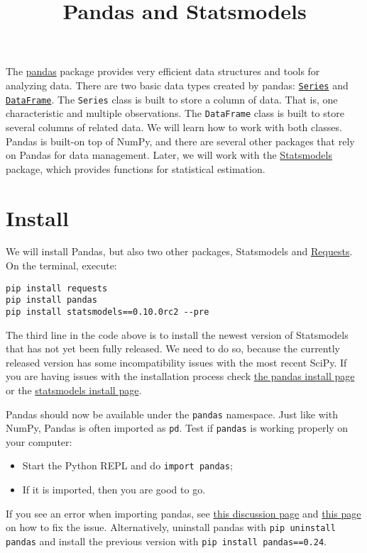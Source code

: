 \documentclass[12pt, a4paper]{article}
\date{}
\title{Pandas and Statsmodels}
\begin{document}
\maketitle
The \href{https://pandas.pydata.org}{pandas} package provides very efficient data structures and tools for analyzing data.
There are two basic data types created by pandas: \href{https://pandas.pydata.org/pandas-docs/stable/reference/series.html}{\texttt{Series}} and \href{https://pandas.pydata.org/pandas-docs/stable/reference/frame.html}{\texttt{DataFrame}}.
The \texttt{Series} class is built to store a column of data.
That is, one characteristic and multiple observations.
The \texttt{DataFrame} class is built to store several columns of related data.
We will learn how to work with both classes.
Pandas is built-on top of NumPy, and there are several other packages that rely on Pandas for data management.
Later, we will work with the \href{https://www.statsmodels.org/stable/index.html}{Statsmodels} package, which provides functions for statistical estimation.
\section{Install}
\label{sec:org51a9f00}
We will install Pandas, but also two other packages, Statsmodels and \href{https://2.python-requests.org/en/master/}{Requests}.
On the terminal, execute:
\lstset{language=bash,label= ,caption= ,captionpos=b,firstnumber=1,numbers=left,style=bash}
\begin{lstlisting}
pip install requests
pip install pandas
pip install statsmodels==0.10.0rc2 --pre
\end{lstlisting}
The third line in the code above is to install the newest version of Statsmodels that has not yet been fully released.
We need to do so, because the currently released version has some incompatibility issues with the most recent SciPy.
If you are having issues with the installation process check \href{https://pandas.pydata.org/pandas-docs/stable/install.html}{the pandas install page} or the \href{https://www.statsmodels.org/stable/install.html}{statsmodels install page}.

Pandas should now be available under the \texttt{pandas} namespace.
Just like with NumPy, Pandas is often imported as \texttt{pd}.
Test if \texttt{pandas} is working properly on your computer:
\begin{itemize}
\item Start the Python REPL and do \texttt{import pandas};
\item If it is imported, then you are good to go.
\end{itemize}
If you see an error when importing pandas, see \href{https://github.com/pandas-dev/pandas/issues/27532}{this discussion page} and \href{https://github.com/pyenv/pyenv/wiki/Common-build-problems}{this page} on how to fix the issue.
Alternatively, uninstall pandas with \texttt{pip uninstall pandas} and install the previous version with \texttt{pip install pandas==0.24}.
\end{document}
